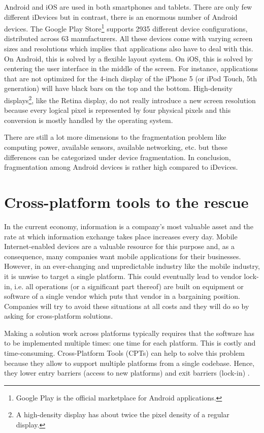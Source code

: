 Android and iOS are used in both smartphones and tablets. There are only few different iDevices  but in contrast, there is an enormous number of Android devices. The Google Play Store\footnote{Google Play is the official marketplace for Android applications.} supports 2935 different device configurations, distributed across 63 manufacturers. All these devices come  with varying screen sizes and resolutions which implies that applications also have to deal with this. On Android, this is solved by a flexible layout system. On iOS, this is solved by centering the user interface in the middle of the screen. For instance, applications that are not optimized for the 4-inch display of the iPhone 5 (or iPod Touch, 5th generation) will have black bars on the top and the bottom. High-density displays\footnote{A high-density display has about twice the pixel density of a regular display.}, like the Retina display, do not really introduce a new screen resolution because every logical pixel is represented by four physical pixels and this conversion is mostly handled by the operating system.

There are still a lot more dimensions to the fragmentation problem like computing power, available sensors, available networking, etc. but these differences can be categorized under device fragmentation. In conclusion, fragmentation among Android devices is rather high compared to iDevices.

\section{Cross-platform tools to the rescue}

In the current economy, information is a company's most valuable asset and the rate at which information exchange takes place increases every day. Mobile Internet-enabled devices are a valuable resource for this purpose and, as a consequence, many companies want mobile applications for their businesses. However, in an ever-changing and unpredictable industry like the mobile industry, it is unwise to target a single platform. This could eventually lead to vendor lock-in, i.e. all operations (or a significant part thereof) are built on equipment or software of a single vendor which puts that vendor in a bargaining position. Companies will try to avoid these situations at all costs and they will do so by asking for cross-platform solutions. 

Making a solution work across platforms typically requires that the software has to be implemented multiple times: one time for each platform. This is costly and time-consuming. Cross-Platform Tools (CPTs) can help to solve this problem because they allow to support multiple platforms from a single codebase. Hence, they lower entry barriers (access to new platforms) and exit barriers (lock-in) \cite{VMCPT:2012}. 

